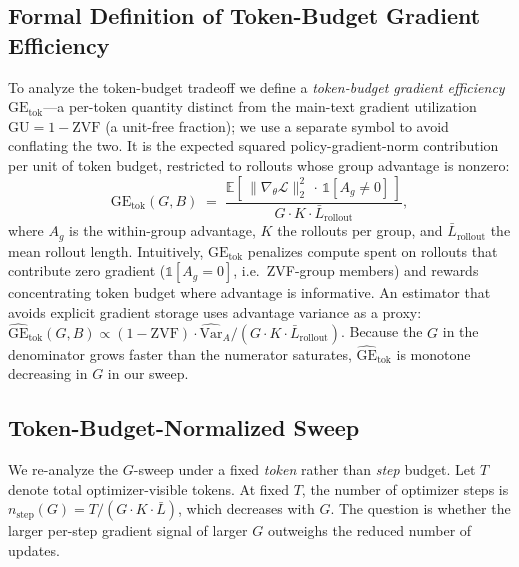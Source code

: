 \documentclass{article}
\begin{document}
\subsection{Formal Definition of Token-Budget Gradient Efficiency}

To analyze the token-budget tradeoff we define a \emph{token-budget gradient
efficiency} $\mathrm{GE}_{\text{tok}}$---a per-token quantity distinct from the
main-text gradient utilization $\mathrm{GU}{=}1{-}\mathrm{ZVF}$ (a unit-free
fraction); we use a separate symbol to avoid conflating the two. It is the
expected squared policy-gradient-norm contribution per unit of token budget,
restricted to rollouts whose group advantage is nonzero:
\begin{equation}
\label{eq:gu}
\mathrm{GE}_{\text{tok}}(G, B) \;=\;
\frac{\displaystyle\mathbb{E}\!\left[\,\|\nabla_\theta \mathcal{L}\|_2^{2}\,\cdot\,
  \mathbb{1}\!\left[A_g \ne 0\right]\,\right]}
{\displaystyle G \cdot K \cdot \bar{L}_\text{rollout}},
\end{equation}
where $A_g$ is the within-group advantage, $K$ the rollouts per group,
and $\bar{L}_\text{rollout}$ the mean rollout length.
Intuitively, $\mathrm{GE}_{\text{tok}}$ penalizes compute spent on rollouts that
contribute zero gradient ($\mathbb{1}[A_g\!=\!0]$, i.e.~ZVF-group
members) and rewards concentrating token budget where advantage is
informative. An estimator that avoids explicit gradient storage uses
advantage variance as a proxy:
$\widehat{\mathrm{GE}}_{\text{tok}}(G,B) \!\propto\!
 (1 - \mathrm{ZVF}) \cdot \widehat{\mathrm{Var}}_A / (G\cdot K \cdot \bar{L}_\text{rollout})$.
Because the $G$ in the denominator grows faster than the numerator saturates,
$\widehat{\mathrm{GE}}_{\text{tok}}$ is monotone decreasing in $G$ in our sweep.

\subsection{Token-Budget-Normalized Sweep}

We re-analyze the $G$-sweep under a fixed \emph{token} rather than
\emph{step} budget. Let $T$ denote total optimizer-visible tokens.
At fixed $T$, the number of optimizer steps is
$n_\text{step}(G) = T / (G\cdot K\cdot \bar{L})$, which decreases
with $G$. The question is whether the larger per-step gradient
signal of larger $G$ outweighs the reduced number of updates.
\end{document}
